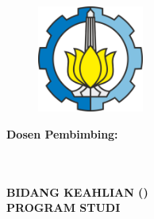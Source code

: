 \begin{flushleft}

    \color{white}

    \begin{figure}[h]
        \flushleft \raggedright
        \includegraphics[width = 3.5cm, height = 3.5cm]{src/resources/its-logo.png}
    \end{figure}

    \vspace{3.0cm}

    { \selectfont \large \bfseries \MakeUppercase
        {\essay}
    }

    \vspace{0.9cm}

    { \selectfont \Large \bfseries \MakeUppercase
        {\thetitle}
    }

    \vspace{0.9cm}

    \begin{singlespace}
   	    { \selectfont \large \bfseries \MakeUppercase
   	        {\theauthor}
        }
    \end{singlespace}

    \vspace{0.9cm}

    \begin{singlespace}
   	    { \selectfont \normalsize \bfseries
   	        Dosen Pembimbing: \\
                {\firstSupervisorName} \\
                {\secondSupervisorName}
        }
    \end{singlespace}

    \vspace{0.9cm}

    \begin{singlespace}
   	    { \selectfont
            \normalsize \bfseries \MakeUppercase {
                {\postgraduateProgram} \\
                Bidang Keahlian {\postgraduateCourseClass} ({\postgraduateCourseClassShort}) \\
                Program Studi {\postgraduateDegree} {\postgraduateConcentration} \\
                {\postgraduateDepartment} \\
                {\postgraduateFaculty} \\
                {\postgraduateUniversity} \\
                {\postgraduateCity} \\
                {\postgraduateYear}
            }
        }
    \end{singlespace}

\end{flushleft}

\restoregeometry

\clearpage

